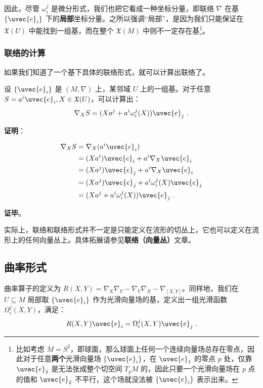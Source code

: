 因此，尽管 $\omega_i^j$ 是微分形式，我们也把它看成一种坐标分量，即联络 $\nabla$ 在基 $\{\uvec{e}_i\}$ 下的\textbf{局部}坐标分量。之所以强调“局部”，是因为我们只能保证在 $\mathfrak{X}(U)$ 中能找到一组基，而在整个 $\mathfrak{X}(M)$ 中则不一定存在基\footnote{比如考虑 $M=S^2$，即球面，那么球面上任何一个连续向量场总存在零点，因此对于任意\textbf{两个}光滑向量场 $\{\uvec{e}_i\}$，在 $\uvec{e}_1$ 的零点 $p$ 处，仅靠 $\uvec{e}_2$ 是无法张成整个切空间 $T_pM$ 的，因此只要一个光滑向量场在 $p$ 点的值和 $\uvec{e}_2$ 不平行，这个场就没法被 $\{\uvec{e}_i\}$ 表示出来。}。

\subsubsection{联络的计算}

如果我们知道了一个基下具体的联络形式，就可以计算出联络了。

\begin{theorem}{}
设 $\{\uvec{e}_i\}$ 是 $(M, \nabla)$ 上，某邻域 $U$ 上的一组基。对于任意 $S=a^i\uvec{e}_i, X\in\mathfrak{X}(U)$，可以计算出：
\begin{equation}
\nabla_XS=(Xa^j+a^i\omega^j_i(X))\uvec{e}_j~.
\end{equation}
\end{theorem}

\textbf{证明}：

\begin{equation}
\begin{aligned}
\nabla_XS&=\nabla_X(a^i\uvec{e}_i)\\
&=(Xa^i)\uvec{e}_i+a^i\nabla_X\uvec{e}_i\\
&=(Xa^j)\uvec{e}_j+a^i\nabla_X\uvec{e}_i\\
&=(Xa^j)\uvec{e}_j+a^i\omega^j_i(X)\uvec{e}_j\\
&=(Xa^j+a^i\omega^j_i(X))\uvec{e}_j~.
\end{aligned}
\end{equation}

\textbf{证毕}。

实际上，联络和联络形式并不一定是只能定义在流形的切丛上，它也可以定义在流形上的任何向量丛上。具体拓展请参见\textbf{联络（向量丛）}文章。

\subsection{曲率形式}

曲率算子的定义为 $R(X, Y)=\nabla_X\nabla_Y-\nabla_Y\nabla_X-\nabla_{[X, Y]}$。同样地，我们在 $U\subseteq M$ 局部取 $\{\uvec{e}_i\}$ 作为光滑向量场的基，定义出一组光滑函数 $\Omega^j_i(X, Y)$，满足：
\begin{equation}\label{eq_ConFom_1}
R(X, Y)\uvec{e}_i=\Omega^j_i(X, Y)\uvec{e}_j~.
\end{equation}

